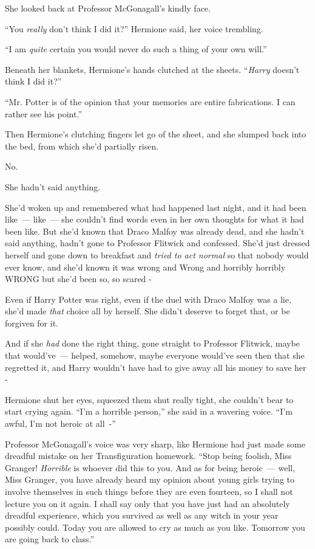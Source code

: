 She looked back at Professor McGonagall's kindly face.

``You \emph{really} don't think I did it?'' Hermione said, her voice trembling.

``I am \emph{quite} certain you would never do such a thing of your own will.''

Beneath her blankets, Hermione's hands clutched at the sheets. ``\emph{Harry} doesn't think I did it?''

``Mr. Potter is of the opinion that your memories are entire fabrications. I can rather see his point.''

Then Hermione's clutching fingers let go of the sheet, and she slumped back into the bed, from which she'd partially risen.

No.

She hadn't said anything.

She'd woken up and remembered what had happened last night, and it had been like~--- like~--- she couldn't find words even in her own thoughts for what it had been like. But she'd known that Draco Malfoy was already dead, and she hadn't said anything, hadn't gone to Professor Flitwick and confessed. She'd just dressed herself and gone down to breakfast and \emph{tried to act normal} so that nobody would ever know, and she'd known it was wrong and Wrong and horribly horribly WRONG but she'd been so, so scared -

Even if Harry Potter was right, even if the duel with Draco Malfoy was a lie, she'd made \emph{that} choice all by herself. She didn't deserve to forget that, or be forgiven for it.

And if she \emph{had} done the right thing, gone straight to Professor Flitwick, maybe that would've~--- helped, somehow, maybe everyone would've seen then that she regretted it, and Harry wouldn't have had to give away all his money to save her -

Hermione shut her eyes, squeezed them shut really tight, she couldn't bear to start crying again. ``I'm a horrible person,'' she said in a wavering voice. ``I'm awful, I'm not heroic at all~-''

Professor McGonagall's voice was very sharp, like Hermione had just made some dreadful mistake on her Transfiguration homework. ``Stop being foolish, Miss Granger! \emph{Horrible} is whoever did this to you. And as for being heroic~--- well, Miss Granger, you have already heard my opinion about young girls trying to involve themselves in such things before they are even fourteen, so I shall not lecture you on it again. I shall say only that you have just had an absolutely dreadful experience, which you survived as well as any witch in your year possibly could. Today you are allowed to cry as much as you like. Tomorrow you are going back to class.''

